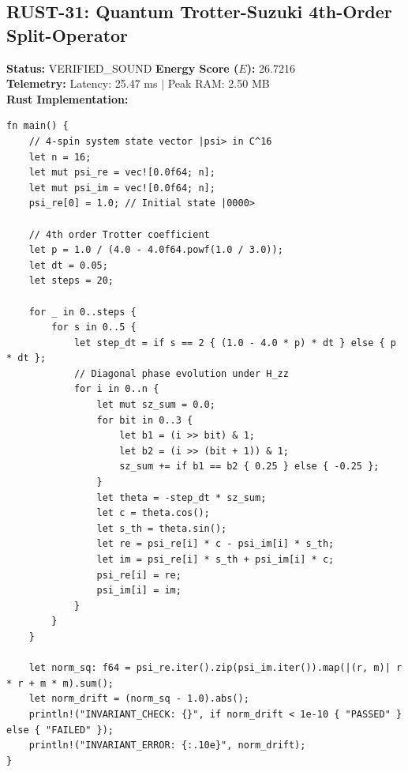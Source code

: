 \documentclass[11pt, a4paper]{article}
\begin{document}
\subsection{RUST-31: Quantum Trotter-Suzuki 4th-Order Split-Operator}
\textbf{Status:} VERIFIED\_SOUND \hfill \textbf{Energy Score ($E$):} 26.7216\\
\textbf{Telemetry:} Latency: 25.47 ms $|$ Peak RAM: 2.50 MB\\
\textbf{Rust Implementation:}
\begin{verbatim}
fn main() {
    // 4-spin system state vector |psi> in C^16
    let n = 16;
    let mut psi_re = vec![0.0f64; n];
    let mut psi_im = vec![0.0f64; n];
    psi_re[0] = 1.0; // Initial state |0000>
    
    // 4th order Trotter coefficient
    let p = 1.0 / (4.0 - 4.0f64.powf(1.0 / 3.0));
    let dt = 0.05;
    let steps = 20;
    
    for _ in 0..steps {
        for s in 0..5 {
            let step_dt = if s == 2 { (1.0 - 4.0 * p) * dt } else { p * dt };
            // Diagonal phase evolution under H_zz
            for i in 0..n {
                let mut sz_sum = 0.0;
                for bit in 0..3 {
                    let b1 = (i >> bit) & 1;
                    let b2 = (i >> (bit + 1)) & 1;
                    sz_sum += if b1 == b2 { 0.25 } else { -0.25 };
                }
                let theta = -step_dt * sz_sum;
                let c = theta.cos();
                let s_th = theta.sin();
                let re = psi_re[i] * c - psi_im[i] * s_th;
                let im = psi_re[i] * s_th + psi_im[i] * c;
                psi_re[i] = re;
                psi_im[i] = im;
            }
        }
    }
    
    let norm_sq: f64 = psi_re.iter().zip(psi_im.iter()).map(|(r, m)| r * r + m * m).sum();
    let norm_drift = (norm_sq - 1.0).abs();
    println!("INVARIANT_CHECK: {}", if norm_drift < 1e-10 { "PASSED" } else { "FAILED" });
    println!("INVARIANT_ERROR: {:.10e}", norm_drift);
}
\end{verbatim}
\end{document}
